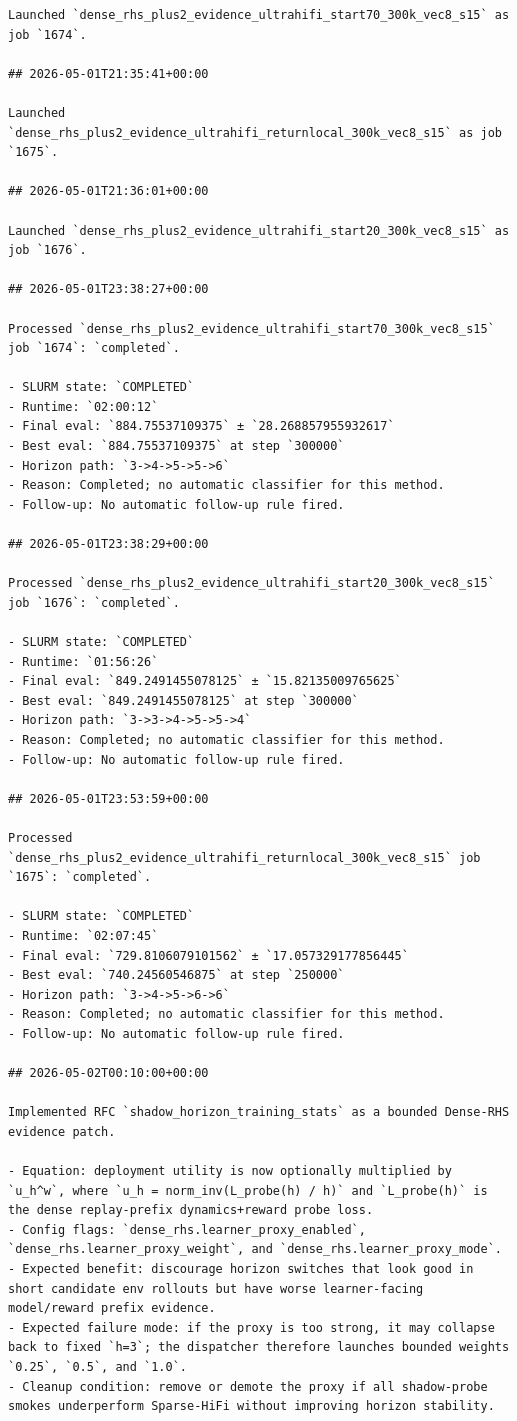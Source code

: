 \begin{verbatim}
Launched `dense_rhs_plus2_evidence_ultrahifi_start70_300k_vec8_s15` as job `1674`.

## 2026-05-01T21:35:41+00:00

Launched `dense_rhs_plus2_evidence_ultrahifi_returnlocal_300k_vec8_s15` as job `1675`.

## 2026-05-01T21:36:01+00:00

Launched `dense_rhs_plus2_evidence_ultrahifi_start20_300k_vec8_s15` as job `1676`.

## 2026-05-01T23:38:27+00:00

Processed `dense_rhs_plus2_evidence_ultrahifi_start70_300k_vec8_s15` job `1674`: `completed`.

- SLURM state: `COMPLETED`
- Runtime: `02:00:12`
- Final eval: `884.75537109375` ± `28.268857955932617`
- Best eval: `884.75537109375` at step `300000`
- Horizon path: `3->4->5->5->6`
- Reason: Completed; no automatic classifier for this method.
- Follow-up: No automatic follow-up rule fired.

## 2026-05-01T23:38:29+00:00

Processed `dense_rhs_plus2_evidence_ultrahifi_start20_300k_vec8_s15` job `1676`: `completed`.

- SLURM state: `COMPLETED`
- Runtime: `01:56:26`
- Final eval: `849.2491455078125` ± `15.82135009765625`
- Best eval: `849.2491455078125` at step `300000`
- Horizon path: `3->3->4->5->5->4`
- Reason: Completed; no automatic classifier for this method.
- Follow-up: No automatic follow-up rule fired.

## 2026-05-01T23:53:59+00:00

Processed `dense_rhs_plus2_evidence_ultrahifi_returnlocal_300k_vec8_s15` job `1675`: `completed`.

- SLURM state: `COMPLETED`
- Runtime: `02:07:45`
- Final eval: `729.8106079101562` ± `17.057329177856445`
- Best eval: `740.24560546875` at step `250000`
- Horizon path: `3->4->5->6->6`
- Reason: Completed; no automatic classifier for this method.
- Follow-up: No automatic follow-up rule fired.

## 2026-05-02T00:10:00+00:00

Implemented RFC `shadow_horizon_training_stats` as a bounded Dense-RHS evidence patch.

- Equation: deployment utility is now optionally multiplied by `u_h^w`, where `u_h = norm_inv(L_probe(h) / h)` and `L_probe(h)` is the dense replay-prefix dynamics+reward probe loss.
- Config flags: `dense_rhs.learner_proxy_enabled`, `dense_rhs.learner_proxy_weight`, and `dense_rhs.learner_proxy_mode`.
- Expected benefit: discourage horizon switches that look good in short candidate env rollouts but have worse learner-facing model/reward prefix evidence.
- Expected failure mode: if the proxy is too strong, it may collapse back to fixed `h=3`; the dispatcher therefore launches bounded weights `0.25`, `0.5`, and `1.0`.
- Cleanup condition: remove or demote the proxy if all shadow-probe smokes underperform Sparse-HiFi without improving horizon stability.


\end{verbatim}
